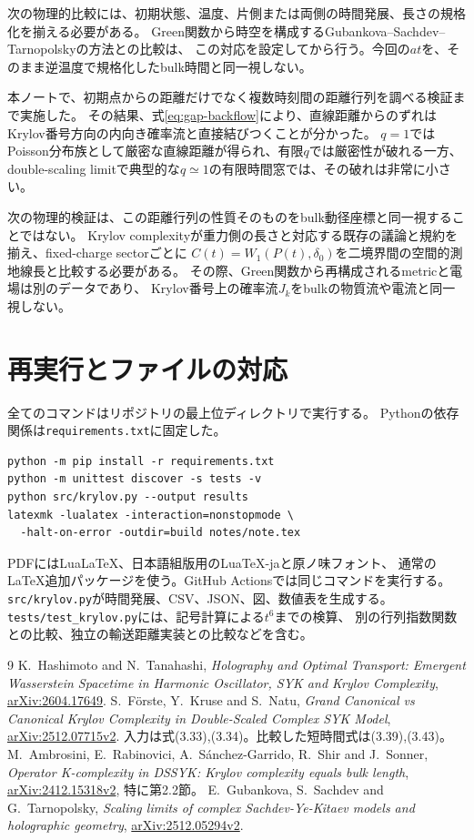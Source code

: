 \documentclass[a4paper,11pt]{ltjsarticle}
\numberwithin{equation}{section}
\begin{document}
次の物理的比較には、初期状態、温度、片側または両側の時間発展、長さの規格化を揃える必要がある。
Green関数から時空を構成するGubankova--Sachdev--Tarnopolskyの方法\cite{Gubankova}との比較は、
この対応を設定してから行う。今回の$at$を、そのまま逆温度で規格化したbulk時間と同一視しない。

本ノートで、初期点からの距離だけでなく複数時刻間の距離行列を調べる検証まで実施した。
その結果、式\eqref{eq:gap-backflow}により、直線距離からのずれはKrylov番号方向の内向き確率流と直接結びつくことが分かった。
$q=1$ではPoisson分布族として厳密な直線距離が得られ、有限$q$では厳密性が破れる一方、
double-scaling limitで典型的な$q\simeq1$の有限時間窓では、その破れは非常に小さい。

次の物理的検証は、この距離行列の性質そのものをbulk動径座標と同一視することではない。
Krylov complexityが重力側の長さと対応する既存の議論と規約を揃え、fixed-charge sectorごとに
$C(t)=W_1(P(t),\delta_0)$を二境界間の空間的測地線長と比較する必要がある。
その際、Green関数から再構成されるmetricと電場は別のデータであり、
Krylov番号上の確率流$J_k$をbulkの物質流や電流と同一視しない。

\appendix
\section{再実行とファイルの対応}
全てのコマンドはリポジトリの最上位ディレクトリで実行する。
Pythonの依存関係は\texttt{requirements.txt}に固定した。
\begin{verbatim}
python -m pip install -r requirements.txt
python -m unittest discover -s tests -v
python src/krylov.py --output results
latexmk -lualatex -interaction=nonstopmode \
  -halt-on-error -outdir=build notes/note.tex
\end{verbatim}
PDFにはLuaLaTeX、日本語組版用のLuaTeX-jaと原ノ味フォント、
通常のLaTeX追加パッケージを使う。GitHub Actionsでは同じコマンドを実行する。
\texttt{src/krylov.py}が時間発展、CSV、JSON、図、数値表を生成する。
\texttt{tests/test\_krylov.py}には、記号計算による$t^6$までの検算、
別の行列指数関数との比較、独立の輸送距離実装との比較などを含む。

\begin{thebibliography}{9}
K.~Hashimoto and N.~Tanahashi,
\emph{Holography and Optimal Transport: Emergent Wasserstein Spacetime in Harmonic Oscillator, SYK and Krylov Complexity},
\href{https://arxiv.org/abs/2604.17649}{arXiv:2604.17649}.
S.~F\"orste, Y.~Kruse and S.~Natu,
\emph{Grand Canonical vs Canonical Krylov Complexity in Double-Scaled Complex SYK Model},
\href{https://arxiv.org/abs/2512.07715v2}{arXiv:2512.07715v2}.
入力は式(3.33),(3.34)。比較した短時間式は(3.39),(3.43)。
M.~Ambrosini, E.~Rabinovici, A.~S\'anchez-Garrido, R.~Shir and J.~Sonner,
\emph{Operator K-complexity in DSSYK: Krylov complexity equals bulk length},
\href{https://arxiv.org/abs/2412.15318v2}{arXiv:2412.15318v2}, 特に第2.2節。
\bibitem{Gubankova}
E.~Gubankova, S.~Sachdev and G.~Tarnopolsky,
\emph{Scaling limits of complex Sachdev-Ye-Kitaev models and holographic geometry},
\href{https://arxiv.org/abs/2512.05294v2}{arXiv:2512.05294v2}.
\end{thebibliography}
\end{document}
